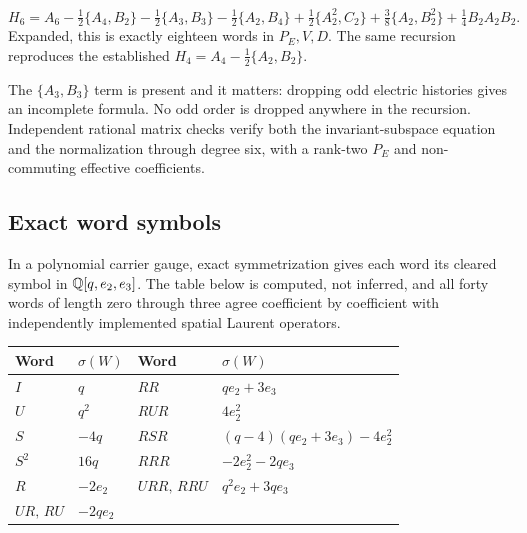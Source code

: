 \begin{theorem}
\label{thm:folds}
\begin{equation}
  H_6 = A_6 - \tfrac12\{A_4,B_2\} - \tfrac12\{A_3,B_3\}
        - \tfrac12\{A_2,B_4\} + \tfrac12\{A_2^2,C_2\}
        + \tfrac38\{A_2,B_2^2\} + \tfrac14 B_2 A_2 B_2 .
  \label{eq:F6}
\end{equation}
Expanded, this is exactly eighteen words in $P_E, V, D$. The same
recursion reproduces the established $H_4 = A_4 - \tfrac12\{A_2,B_2\}$.
\end{theorem}

The $\{A_3,B_3\}$ term is present and it matters: dropping odd electric
histories gives an incomplete formula. No odd order is dropped anywhere
in the recursion. Independent rational matrix checks verify both the
invariant-subspace equation and the normalization through degree six,
with a rank-two $P_E$ and non-commuting effective coefficients.


\subsection{Exact word symbols}

In a polynomial carrier gauge, exact symmetrization gives each word its
cleared symbol in $\mathbb{Q}[q, e_2, e_3]$. The table below is computed, not
inferred, and all forty words of length zero through three agree
coefficient by coefficient with independently implemented spatial
Laurent operators.

\begin{center}
\begin{tabular}{@{}ll@{\qquad}ll@{}}
\toprule
Word & $\sigma(W)$ & Word & $\sigma(W)$ \\
\midrule
$I$        & $q$          & $RR$        & $q e_2 + 3 e_3$ \\
$U$        & $q^2$        & $RUR$       & $4 e_2^2$ \\
$S$        & $-4q$        & $RSR$       & $(q-4)(q e_2 + 3e_3) - 4e_2^2$ \\
$S^2$      & $16q$        & $RRR$       & $-2e_2^2 - 2q e_3$ \\
$R$        & $-2e_2$      & $URR,\,RRU$ & $q^2 e_2 + 3 q e_3$ \\
$UR,\,RU$  & $-2q e_2$    &             & \\
\bottomrule
\end{tabular}
\end{center}

